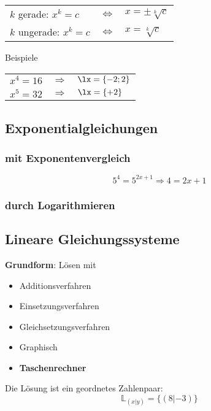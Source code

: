 \begin{multicols}{2}
\begin{tabular}{lcl}
$k$ gerade:   $x^k=c$ & $\Leftrightarrow$ & $x=\pm\sqrt[k]{c}$\\
$k$ ungerade: $x^k=c$ & $\Leftrightarrow$ & $x=\sqrt[k]{c}$\\
\end{tabular}

Beispiele

\begin{tabular}{rcl}
$x^4=16$ & $\Longrightarrow$ & $\lx=\{-2; 2\}  $ \\
$x^5=32$ & $\Longrightarrow$ & $\lx=\{+2\}  $ \\

\end{tabular}
\subsection*{Exponentialgleichungen}
\subsubsection*{mit Exponentenvergleich}

$$5^4 = 5^{2x+1} \Longrightarrow  4=2x+1$$

\subsubsection*{durch Logarithmieren}


\subsection*{Lineare Gleichungssysteme}
\textbf{Grundform}:
Lösen mit
\begin{itemize}
\item Additionsverfahren
\item Einsetzungsverfahren
\item Gleichsetzungsverfahren
\item Graphisch
\item \textbf{Taschenrechner}
\end{itemize}
Die Lösung ist ein geordnetes Zahlenpaar:
$$\mathbb{L}_{(x | y)} = \{(8 | -3)\}$$



\end{multicols}
